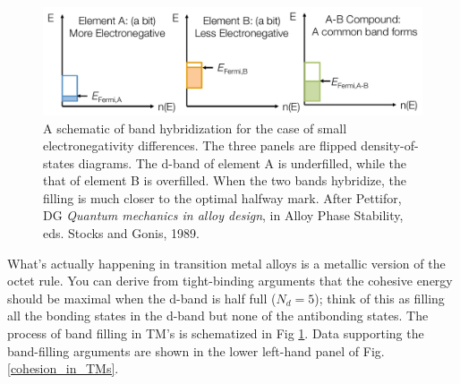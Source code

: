 \documentclass[12pt]{article}
\begin{document}
\begin{figure}[h]
\centering
\includegraphics[width=\textwidth]{bandFilingSchematic}
\caption{A schematic of band hybridization for the case of small electronegativity differences. The three panels are flipped density-of-states diagrams. The d-band of element A is underfilled, while the that of element B is overfilled. When the two bands hybridize, the filling is much closer to the optimal halfway mark. After Pettifor, DG \textit{Quantum mechanics in alloy design}, in Alloy Phase Stability, eds. Stocks and Gonis, 1989.}
\label{bandOverlap}
\end{figure}

What's actually happening in transition metal alloys is a metallic version of the octet rule. You can derive from tight-binding arguments that the cohesive energy should be maximal when the d-band is half full ($N_d=5$); think of this as filling all the bonding states in the d-band but none of the antibonding states. The process of band filling in TM's is schematized in Fig \ref{bandOverlap}. Data supporting the band-filling arguments are shown in the lower left-hand panel of Fig. \ref{cohesion_in_TMs}.
\end{document}
